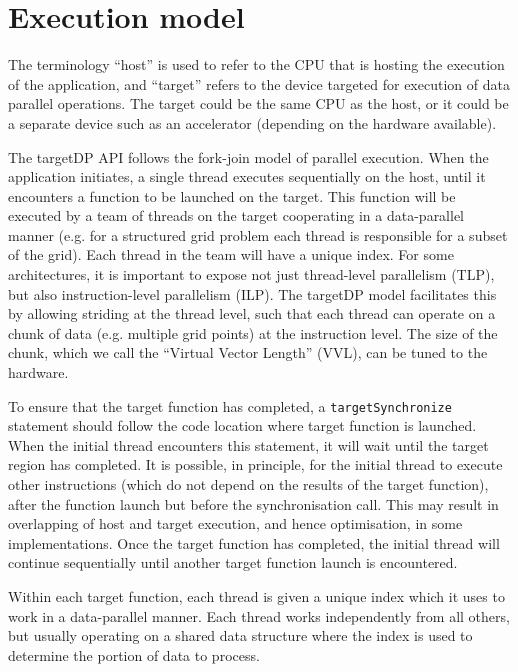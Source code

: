 \chapter{Execution model}\label{sec:exmodel}

The terminology ``host'' is used to refer to the CPU that is hosting
the execution of the application, and ``target'' refers to the
device targeted for execution of data parallel operations. The target
could be the same CPU as the host, or it could be a separate device such
as an accelerator (depending on the hardware available). 

The targetDP API follows the fork-join model of parallel
execution. When the application initiates, a single thread executes
sequentially on the host, until it encounters a function to be
launched on the target. This function will be executed by a team of
threads on the target cooperating in a data-parallel manner (e.g. for
a structured grid problem each thread is responsible for a subset of
the grid). Each thread in the team will have a unique index. For some
architectures, it is important to expose not just thread-level
parallelism (TLP), but also instruction-level parallelism (ILP). The
targetDP model facilitates this by allowing striding at the thread
level, such that each thread can operate on a chunk of data
(e.g. multiple grid points) at the instruction level. The size of the
chunk, which we call the ``Virtual Vector Length'' (VVL), can be tuned
to the hardware.

To ensure that the target function has completed, a
\verb+targetSynchronize+ statement should follow the code location
where target function is launched. When the initial thread encounters
this statement, it will wait until the target region has completed. It
is possible, in principle, for the initial thread to execute other instructions
(which do not depend on the results of the target function), after the
function launch but before the synchronisation call. This may result in
overlapping of host and target execution, and hence optimisation, in
some implementations. Once the target function has completed, the
initial thread will continue sequentially until another target
function launch is encountered.

Within each target function, each thread is given a unique index which
it uses to work in a data-parallel manner. Each thread works
independently from all others, but usually operating on a shared data
structure where the index is used to determine the portion of data
to process.

